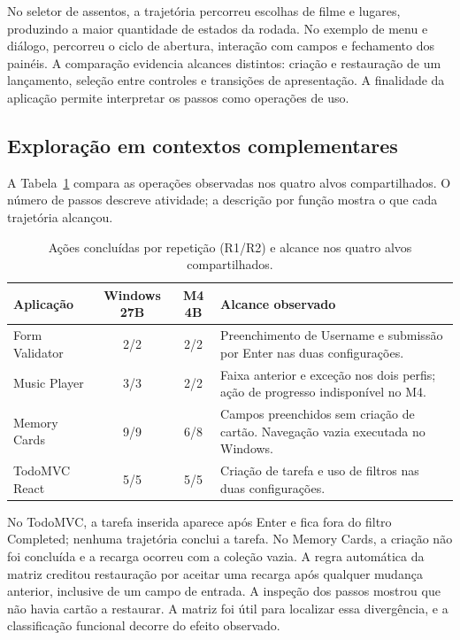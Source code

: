 \documentclass[12pt]{article}
\begin{document}
No seletor de assentos, a trajetória percorreu escolhas de filme e lugares, produzindo a maior quantidade de estados da rodada. No exemplo de menu e diálogo, percorreu o ciclo de abertura, interação com campos e fechamento dos painéis. A comparação evidencia alcances distintos: criação e restauração de um lançamento, seleção entre controles e transições de apresentação. A finalidade da aplicação permite interpretar os passos como operações de uso.

\subsection{Exploração em contextos complementares}
A Tabela~\ref{tab:diverse} compara as operações observadas nos quatro alvos compartilhados. O número de passos descreve atividade; a descrição por função mostra o que cada trajetória alcançou.

\begin{table}[ht]
\centering\small
\caption{Ações concluídas por repetição (R1/R2) e alcance nos quatro alvos compartilhados.}
\label{tab:diverse}
\begin{tabular}{lcc>{\raggedright\arraybackslash}p{6.6cm}}
\toprule
Aplicação & Windows 27B & M4 4B & Alcance observado\\
\midrule
Form Validator & 2/2 & 2/2 & Preenchimento de Username e submissão por Enter nas duas configurações.\\
Music Player & 3/3 & 2/2 & Faixa anterior e exceção nos dois perfis; ação de progresso indisponível no M4.\\
Memory Cards & 9/9 & 6/8 & Campos preenchidos sem criação de cartão. Navegação vazia executada no Windows.\\
TodoMVC React & 5/5 & 5/5 & Criação de tarefa e uso de filtros nas duas configurações.\\
\bottomrule
\end{tabular}
\end{table}

No TodoMVC, a tarefa inserida aparece após Enter e fica fora do filtro Completed; nenhuma trajetória conclui a tarefa. No Memory Cards, a criação não foi concluída e a recarga ocorreu com a coleção vazia. A regra automática da matriz creditou restauração por aceitar uma recarga após qualquer mudança anterior, inclusive de um campo de entrada. A inspeção dos passos mostrou que não havia cartão a restaurar. A matriz foi útil para localizar essa divergência, e a classificação funcional decorre do efeito observado.
\end{document}
